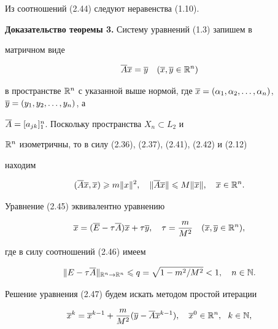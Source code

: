 Из соотношений (2.44) следуют  неравенства (1.10).


\medskip





{\bf Доказательство теоремы 3.} Систему уравнений (1.3) запишем в


матричном виде


\begin{equation}


\ol{A}\ol{x} = \ol{y}\quad (\ol{x},\ol{y}\in \R^n)


\end{equation}


в пространстве $\R^n$ с указанной выше нормой, где $\ol{x} =


(\alpha_1,\alpha_2,\dotsc,\alpha_n)$, $\ol{y} = (y_1, y_2, \dotsc, y_n)$, а


$\overline{A} = [a_{jk}]_1^n$. Поскольку пространства $X_n\subset L_2$ и


$\Bbb R^n$ изометричны, то в силу (2.36), (2.37), (2.41), (2.42) и (2.12)


находим


\begin{equation}


(\ol{A}\ol{x},\ol{x})\gea m\|x\|^2,\quad \|\ol{A}\ol{x}\|\lea


M\|\ol{x}\|,\quad \ol{x}\in \R^n.


\end{equation}


Уравнение (2.45) эквивалентно уравнению


\begin{equation}


\ol{x} = (\ol{E}-\tau\ol{A})\ol{x}+\tau \ol{y},\quad \tau =


\frac{m}{M^2}\quad (\ol{x},\ol{y}\in \R^n),


\end{equation}


где в силу соотношений (2.46) имеем


\begin{equation}


\|E-\tau\ol{A}\|_{\R^n\to \R^n}\lea q = \sqrt{1-m^2/M^2}<1, \quad n\in \N.


\end{equation}





Решение уравнения (2.47) будем искать методом простой итерации


\begin{equation}


\ol{x}^k = \ol{x}^{k-1}+\frac{m}{M^2}(\ol{y}-\ol{A}\ol{x}^{k-1}),\quad


\ol{x}^0\in \R^n,\ \ k\in \N,


\end{equation}


